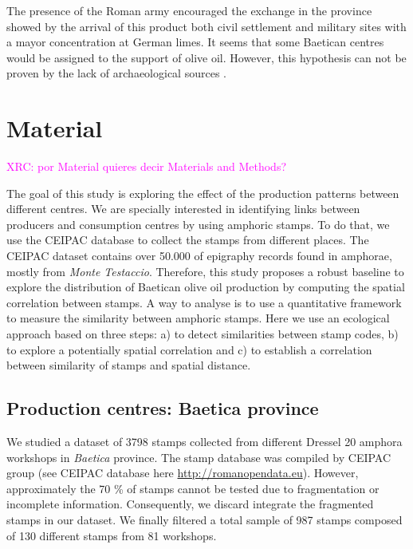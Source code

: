 \documentclass[review]{elsarticle}
\newcommand{\memo}[2]{\textcolor{#1}{#2}}
\newcommand{\xavi}[1]{\memo{magenta}{XRC: #1\\}}
\begin{document}
The presence of the Roman army encouraged the exchange in the province showed by the arrival of this product both civil settlement and military sites with a mayor concentration at German limes. It seems that some Baetican centres would be assigned to the support of olive oil. However, this hypothesis can not be proven by the lack of archaeological sources \citep[125]{remesal_concierto}. 



\section{Material}

\xavi{por Material quieres decir Materials and Methods?}


The goal of this study is exploring the effect of the production patterns between different centres. We are specially interested in identifying links between producers and consumption centres by using amphoric stamps. To do that, we use the CEIPAC database to collect the stamps from different places. The CEIPAC dataset contains over 50.000 of epigraphy records found in amphorae, mostly from \textit{Monte Testaccio}. Therefore, this study proposes a robust baseline to explore the distribution of Baetican olive oil production by computing the spatial correlation between stamps. A way to analyse is to use a quantitative framework to measure the similarity between amphoric stamps. Here we use an ecological approach based on three steps: a) to detect similarities between stamp codes, b) to explore a potentially spatial correlation and c) to establish a correlation between similarity of stamps and spatial distance. 


\subsection{Production centres: Baetica province}

We studied a dataset of 3798 stamps collected from different Dressel 20 amphora workshops in \textit{Baetica} province. The stamp database was compiled by CEIPAC group \citep{remesal_centro_2015} (see CEIPAC database here \url{http://romanopendata.eu}). However, approximately the 70 \% of stamps cannot be tested due to fragmentation or incomplete information. Consequently, we discard integrate the fragmented stamps in our dataset. We finally filtered a total sample of 987 stamps composed of 130 different stamps from 81 workshops. 
\end{document}
